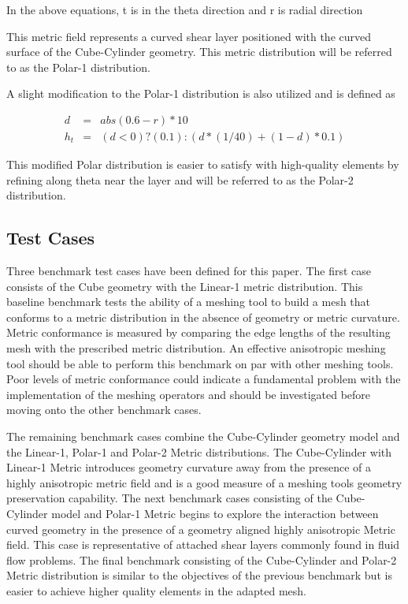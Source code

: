 \documentclass[3p,times,procedia,number]{elsarticle}
\begin{document}
In the above equations, t is in the theta direction and r is radial direction

This metric field represents a curved shear layer positioned with the curved surface of the Cube-Cylinder geometry.  This metric distribution will be referred to as the Polar-1 distribution.   

A slight modification to the Polar-1 distribution is also utilized and is defined as 

\begin{eqnarray}
d &=& abs(0.6 - r) * 10 \\
h_t &=& (d < 0) ? (0.1) : (d * (1 / 40) + (1 - d) * 0.1)
\end{eqnarray}

This modified Polar distribution is easier to satisfy with high-quality elements by refining along theta near the layer and will be referred to as the Polar-2 distribution.

\subsection{Test Cases}
Three benchmark test cases have been defined for this paper.  The first case consists of the Cube geometry with the Linear-1 metric distribution.   This baseline benchmark tests the ability of a meshing tool to build a mesh that conforms to a metric distribution in the absence of geometry or metric curvature.  Metric conformance is measured by comparing the edge lengths of the resulting mesh with the prescribed metric distribution.  An effective anisotropic meshing tool should be able to perform this benchmark on par with other meshing tools.  Poor levels of metric conformance could indicate a fundamental problem with the implementation of the meshing operators and should be investigated before moving onto the other benchmark cases.

The remaining benchmark cases combine the Cube-Cylinder geometry model and the Linear-1, Polar-1 and Polar-2 Metric distributions.  The Cube-Cylinder with Linear-1 Metric introduces geometry curvature away from the presence of a highly anisotropic metric field and is a good measure of a meshing tools geometry preservation capability.  The next benchmark cases consisting of the Cube-Cylinder model and Polar-1 Metric begins to explore the interaction between curved geometry in the presence of a geometry aligned highly anisotropic Metric field.  This case is representative of attached shear layers commonly found in fluid flow problems.  The final benchmark consisting of the Cube-Cylinder and Polar-2 Metric distribution is similar to the objectives of the previous benchmark but is easier to achieve higher quality elements in the adapted mesh.  
\end{document}
